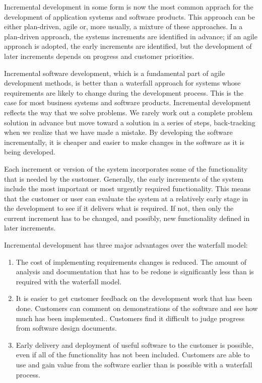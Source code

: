 Incremental development in some form is now the most common apprach for the development of application systems and software products. This approach can be either plan-driven, agile or, more usually, a mixture of these approaches. In a plan-driven approach, the systems increments are identified in advance; if an agile approach is adopted, the early increments are identified, but the development of later increments depends on progress and customer priorities.

Incremental software development, which is a fundamental part of agile development methods, is better than a waterfall approach for systems whose requirements are likely to change during the development process. This is the case for most business systems and software products. Incremental development reflects the way that we solve problems. We rarely work out a complete problem solution in advance but move toward a solution in a series of steps, back-tracking when we realize that we have made a mistake. By developing the software incrementally, it is cheaper and easier to make changes in the software as it is being developed.

Each increment or version of the system incorporates some of the functionality that is needed by the sustomer. Generally, the early increments of the system include the most important or most urgently required functionality. This means that the customer or user can evaluate the system at a relatively early stage in the development to see if it delivers what is required. If not, then only the current increment has to be changed, and possibly, new functionality defined in later increments.

Incremental development has three major advantages over the waterfall model:
\begin{enumerate}
    \item The cost of implementing requirements changes is reduced. The amount of analysis and documentation that has to be redone is significantly less than is required with the waterfall model.
    \item It is easier to get customer feedback on the development work that has been done. Customers can comment on demonstrations of the software and see how much has been implemented.. Customers find it difficult to judge progress from software design documents.
    \item Early delivery and deployment of useful software to the customer is possible, even if all of the functionality has not been included. Customers are able to use and gain value from the software earlier than is possible with a waterfall process.
\end{enumerate}

